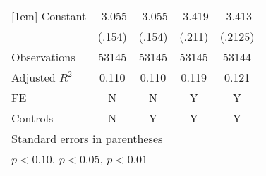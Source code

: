 \begin{table}[htbp]
\begin{tabular}{l*{4}{c}}
[1em]
Constant            &      -3.055\sym{***}&      -3.055\sym{***}&      -3.419\sym{***}&      -3.413\sym{***}\\
                    &      (.154)         &      (.154)         &      (.211)         &     (.2125)         \\
\hline
Observations        &       53145         &       53145         &       53145         &       53144         \\
Adjusted \(R^{2}\)  &       0.110         &       0.110         &       0.119         &       0.121         \\
FE                  &           N         &           N         &           Y         &           Y         \\
Controls            &           N         &           Y         &           Y         &           Y         \\
\hline\hline
\multicolumn{5}{l}{\footnotesize Standard errors in parentheses}\\
\multicolumn{5}{l}{\footnotesize \sym{*} \(p<0.10\), \sym{**} \(p<0.05\), \sym{***} \(p<0.01\)}\\
\end{tabular}
\end{table}
